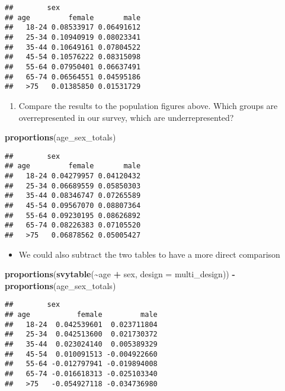 \documentclass[
]{article}
\newenvironment{Shaded}{\begin{snugshade}}{\end{snugshade}}
\newcommand{\AttributeTok}[1]{\textcolor[rgb]{0.13,0.29,0.53}{#1}}
\newcommand{\FunctionTok}[1]{\textcolor[rgb]{0.13,0.29,0.53}{\textbf{#1}}}
\newcommand{\NormalTok}[1]{#1}
\newcommand{\SpecialCharTok}[1]{\textcolor[rgb]{0.81,0.36,0.00}{\textbf{#1}}}
\providecommand{\tightlist}{%
  \setlength{\itemsep}{0pt}\setlength{\parskip}{0pt}}
\begin{document}
\begin{verbatim}
##        sex
## age         female       male
##   18-24 0.08533917 0.06491612
##   25-34 0.10940919 0.08023341
##   35-44 0.10649161 0.07804522
##   45-54 0.10576222 0.08315098
##   55-64 0.07950401 0.06637491
##   65-74 0.06564551 0.04595186
##   >75   0.01385850 0.01531729
\end{verbatim}

\begin{enumerate}
\def\labelenumi{\arabic{enumi}.}
\setcounter{enumi}{1}
\tightlist
\item
  Compare the results to the population figures above. Which groups are
  overrepresented in our survey, which are underrepresented?
\end{enumerate}

\begin{Shaded}
\begin{Highlighting}[]
\FunctionTok{proportions}\NormalTok{(age\_sex\_totals)}
\end{Highlighting}
\end{Shaded}

\begin{verbatim}
##        sex
## age         female       male
##   18-24 0.04279957 0.04120432
##   25-34 0.06689559 0.05850303
##   35-44 0.08346747 0.07265589
##   45-54 0.09567070 0.08807364
##   55-64 0.09230195 0.08626892
##   65-74 0.08226383 0.07105520
##   >75   0.06878562 0.05005427
\end{verbatim}

\begin{itemize}
\tightlist
\item
  We could also subtract the two tables to have a more direct comparison
\end{itemize}

\begin{Shaded}
\begin{Highlighting}[]
\FunctionTok{proportions}\NormalTok{(}\FunctionTok{svytable}\NormalTok{(}\SpecialCharTok{\textasciitilde{}}\NormalTok{age }\SpecialCharTok{+}\NormalTok{ sex, }\AttributeTok{design =}\NormalTok{ multi\_design)) }\SpecialCharTok{{-}} \FunctionTok{proportions}\NormalTok{(age\_sex\_totals)}
\end{Highlighting}
\end{Shaded}

\begin{verbatim}
##        sex
## age           female         male
##   18-24  0.042539601  0.023711804
##   25-34  0.042513600  0.021730372
##   35-44  0.023024140  0.005389329
##   45-54  0.010091513 -0.004922660
##   55-64 -0.012797941 -0.019894008
##   65-74 -0.016618313 -0.025103340
##   >75   -0.054927118 -0.034736980
\end{verbatim}
\end{document}
